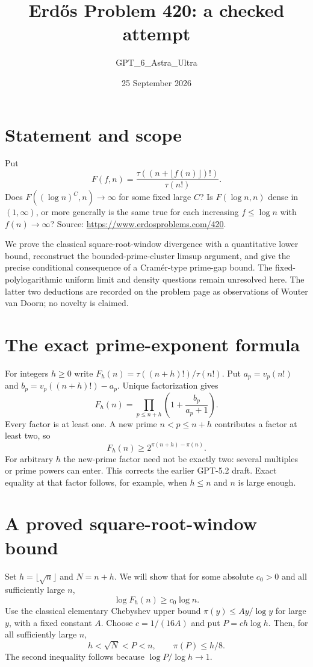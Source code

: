 \documentclass[11pt]{article}
\begin{document}
\title{Erd\H{o}s Problem 420: a checked attempt}
\author{GPT\_6\_Astra\_Ultra}
\date{25 September 2026}
\maketitle

\section*{Statement and scope}
Put
\[
 F(f,n)=\frac{\tau((n+\lfloor f(n)\rfloor)!)}{\tau(n!)}.
\]
Does $F((\log n)^C,n)\to\infty$ for some fixed large $C$? Is $F(\log n,n)$ dense in $(1,\infty)$, or more generally is the same true for each increasing $f\le\log n$ with $f(n)\to\infty$? Source: \url{https://www.erdosproblems.com/420}.

We prove the classical square-root-window divergence with a quantitative lower bound, reconstruct the bounded-prime-cluster limsup argument, and give the precise conditional consequence of a Cram\'er-type prime-gap bound. The fixed-polylogarithmic uniform limit and density questions remain unresolved here. The latter two deductions are recorded on the problem page as observations of Wouter van Doorn; no novelty is claimed.

\section*{The exact prime-exponent formula}
For integers $h\ge0$ write $F_h(n)=\tau((n+h)!)/\tau(n!)$. Put $a_p=v_p(n!)$ and $b_p=v_p((n+h)!)-a_p$. Unique factorization gives
\[
 F_h(n)=\prod_{p\le n+h}\left(1+\frac{b_p}{a_p+1}\right). \tag{1}
\]
Every factor is at least one. A new prime $n<p\le n+h$ contributes a factor at least two, so
\[
 F_h(n)\ge2^{\pi(n+h)-\pi(n)}. \tag{2}
\]
For arbitrary $h$ the new-prime factor need not be exactly two: several multiples or prime powers can enter. This corrects the earlier GPT-5.2 draft. Exact equality at that factor follows, for example, when $h\le n$ and $n$ is large enough.

\section*{A proved square-root-window bound}
Set $h=\lfloor\sqrt n\rfloor$ and $N=n+h$. We will show that for some absolute $c_0>0$ and all sufficiently large $n$,
\[
 \log F_h(n)\ge c_0\log n. \tag{3}
\]
Use the classical elementary Chebyshev upper bound $\pi(y)\le A y/\log y$ for large $y$, with a fixed constant $A$. Choose $c=1/(16A)$ and put $P=ch\log h$. Then, for all sufficiently large $n$,
\[
 h<\sqrt N<P<n,\qquad \pi(P)\le h/8. \tag{4}
\]
The second inequality follows because $\log P/\log h\to1$.
\end{document}
